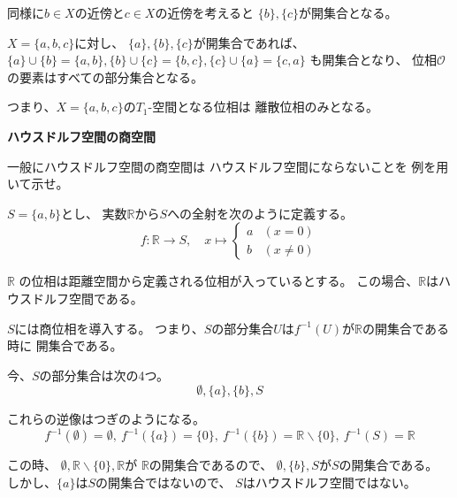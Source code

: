 \documentclass[12pt,b5paper]{ltjsarticle}
\begin{document}
同様に$b\in X$の近傍と$c\in X$の近傍を考えると
$\{b\},\{c\}$が開集合となる。

$X=\{a,b,c\}$に対し、
$\{a\},\{b\},\{c\}$が開集合であれば、
$\{a\}\cup\{b\}=\{a,b\},\{b\}\cup\{c\}=\{b,c\},\{c\}\cup\{a\}=\{c,a\}$
も開集合となり、
位相$\mathcal{O}$の要素はすべての部分集合となる。

つまり、$X=\{a,b,c\}$の$T_{1}$-空間となる位相は
離散位相のみとなる。


\hrulefill

\textbf{ハウスドルフ空間の商空間}

一般にハウスドルフ空間の商空間は
ハウスドルフ空間にならないことを
例を用いて示せ。

\dotfill

$S=\{a,b\}$とし、
実数$\mathbb{R}$から$S$への全射を次のように定義する。
\begin{equation}
 f:\mathbb{R}\to S,\quad
  x\mapsto
  \begin{cases}
   a & (x=0)\\
   b & (x\ne 0)
  \end{cases}
\end{equation}

$\mathbb{R}$
の位相は距離空間から定義される位相が入っているとする。
この場合、$\mathbb{R}$はハウスドルフ空間である。

$S$には商位相を導入する。
つまり、$S$の部分集合$U$は$f^{-1}(U)$が$\mathbb{R}$の開集合である時に
開集合である。

今、$S$の部分集合は次の4つ。
\begin{equation}
 \emptyset,\{a\},\{b\},S
\end{equation}

これらの逆像はつぎのようになる。
\begin{equation}
  f^{-1}(\emptyset)=\emptyset ,\
  f^{-1}(\{a\})=\{0\} ,\
  f^{-1}(\{b\})=\mathbb{R}\backslash\{0\} ,\
  f^{-1}(S)=\mathbb{R}
\end{equation}

この時、
$\emptyset,\mathbb{R}\backslash\{0\},\mathbb{R}$が
$\mathbb{R}$の開集合であるので、
$\emptyset,\{b\},S$が$S$の開集合である。
しかし、$\{a\}$は$S$の開集合ではないので、
$S$はハウスドルフ空間ではない。

\hrulefill
\end{document}
